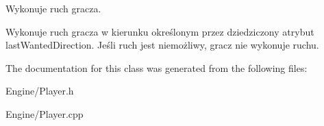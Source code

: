 Wykonuje ruch gracza. 

Wykonuje ruch gracza w kierunku określonym przez dziedziczony atrybut last\+Wanted\+Direction. Jeśli ruch jest niemożliwy, gracz nie wykonuje ruchu. 

The documentation for this class was generated from the following files\+:\begin{DoxyCompactItemize}
\item 
Engine/Player.\+h\item 
Engine/Player.\+cpp\end{DoxyCompactItemize}
